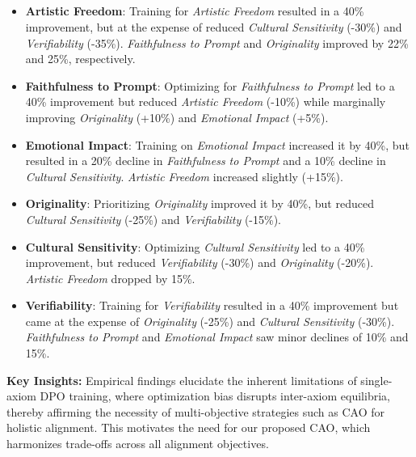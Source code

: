 \subsection*{}

\begin{itemize}
    \item \textbf{Artistic Freedom}: Training for \emph{Artistic Freedom} resulted in a 40\% improvement, but at the expense of reduced \emph{Cultural Sensitivity} (-30\%) and \emph{Verifiability} (-35\%). \emph{Faithfulness to Prompt} and \emph{Originality} improved by 22\% and 25\%, respectively.
    \item \textbf{Faithfulness to Prompt}: Optimizing for \emph{Faithfulness to Prompt} led to a 40\% improvement but reduced \emph{Artistic Freedom} (-10\%) while marginally improving \emph{Originality} (+10\%) and \emph{Emotional Impact} (+5\%).
    \item \textbf{Emotional Impact}: Training on \emph{Emotional Impact} increased it by 40\%, but resulted in a 20\% decline in \emph{Faithfulness to Prompt} and a 10\% decline in \emph{Cultural Sensitivity}. \emph{Artistic Freedom} increased slightly (+15\%).
    \item \textbf{Originality}: Prioritizing \emph{Originality} improved it by 40\%, but reduced \emph{Cultural Sensitivity} (-25\%) and \emph{Verifiability} (-15\%).
    \item \textbf{Cultural Sensitivity}: Optimizing \emph{Cultural Sensitivity} led to a 40\% improvement, but reduced \emph{Verifiability} (-30\%) and \emph{Originality} (-20\%). \emph{Artistic Freedom} dropped by 15\%.
    \item \textbf{Verifiability}: Training for \emph{Verifiability} resulted in a 40\% improvement but came at the expense of \emph{Originality} (-25\%) and \emph{Cultural Sensitivity} (-30\%). \emph{Faithfulness to Prompt} and \emph{Emotional Impact} saw minor declines of 10\% and 15\%.
\end{itemize}




\textbf{Key Insights:} 
Empirical findings elucidate the inherent limitations of single-axiom DPO training, where optimization bias disrupts inter-axiom equilibria, thereby affirming the necessity of multi-objective strategies such as CAO for holistic alignment. This motivates the need for our proposed CAO, which harmonizes trade-offs across all alignment objectives.

